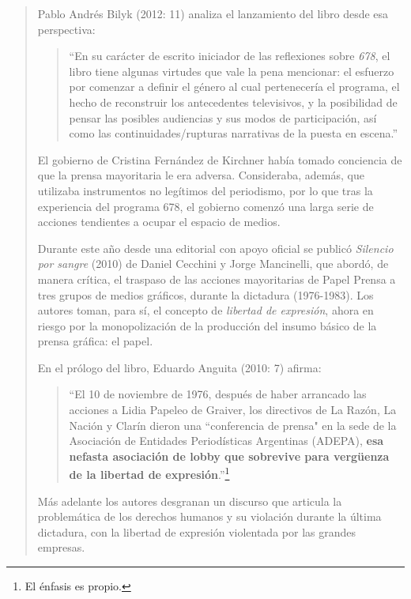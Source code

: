 \begin{quote}
Pablo Andrés Bilyk (2012: 11) analiza el lanzamiento del libro desde esa perspectiva:

\begin{quote}
	\enquote{En su carácter de escrito iniciador de las reflexiones sobre \emph{678}, el libro tiene algunas virtudes que vale la pena mencionar: el esfuerzo por comenzar a definir el género al cual pertenecería el programa, el hecho de reconstruir los antecedentes televisivos, y la posibilidad de pensar las posibles audiencias y sus modos de participación, así como las continuidades/rupturas narrativas de la puesta en escena.}
\end{quote}


El gobierno de Cristina Fernández de Kirchner había tomado conciencia de que la prensa mayoritaria le era adversa. Consideraba, además, que utilizaba instrumentos no legítimos del periodismo, por lo que tras la experiencia del programa 678, el gobierno comenzó una larga serie de acciones tendientes a ocupar el espacio de medios.

Durante este año desde una editorial con apoyo oficial se publicó \emph{Silencio por sangre} (2010) de Daniel Cecchini y Jorge Mancinelli, que abordó, de manera crítica, el traspaso de las acciones mayoritarias de Papel Prensa a tres grupos de medios gráficos, durante la dictadura (1976-1983). Los autores toman, para sí, el concepto de \emph{libertad de expresión}, ahora en riesgo por la monopolización de la producción del insumo básico de la prensa gráfica: el papel.

En el prólogo del libro, Eduardo Anguita (2010: 7) afirma:

\begin{quote}
	\enquote{El 10 de noviembre de 1976, después de haber arrancado las acciones a Lidia Papeleo de Graiver, los directivos de La Razón, La Nación y Clarín dieron una ``conferencia de prensa" en la sede de la Asociación de Entidades Periodísticas Argentinas (ADEPA), \textbf{esa nefasta asociación de lobby que sobrevive para vergüenza de la libertad de expresión}.}\footnote{El énfasis es propio.}
\end{quote}


Más adelante los autores desgranan un discurso que articula la problemática de los derechos humanos y su violación durante la última dictadura, con la libertad de expresión violentada por las grandes empresas.


\end{quote}
